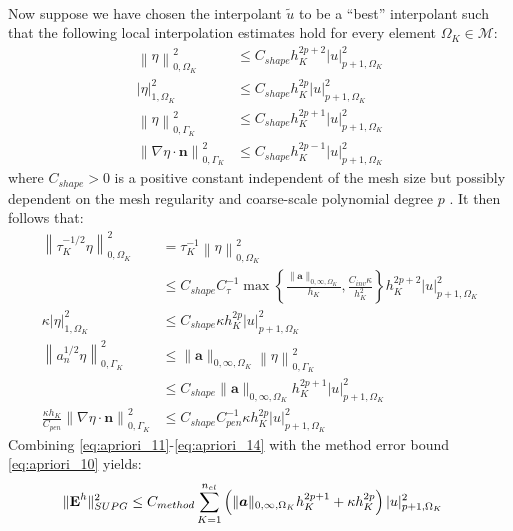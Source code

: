 \documentclass[11pt]{article}
\newenvironment{proof}[1][Proof]{\begin{trivlist}
\item[\hskip \labelsep {\bfseries #1}]}{\end{trivlist}}
\begin{document}
\begin{proof}
\begin{align}
\end{align}
Now suppose we have chosen the interpolant $\tilde{u}$ to be a ``best'' interpolant such that the following local interpolation estimates hold for every element $\Omega_K \in \mathcal{M}$:
\begin{align}
\left\| \eta \right\|^2_{0,\Omega_K} &\leq C_{shape} h_K^{2p+2} | u |^2_{p+1,\Omega_K} \nonumber \\
\left| \eta \right|^2_{1,\Omega_K} &\leq C_{shape} h_K^{2p} | u |^2_{p+1,\Omega_K} \nonumber \\
\left\| \eta \right\|^2_{0,\Gamma_K} &\leq C_{shape} h_K^{2p+1} | u |^2_{p+1,\Omega_K} \nonumber \\
\left\| \nabla \eta \cdot \bm{n} \right\|^2_{0,\Gamma_K} &\leq C_{shape} h_K^{2p-1} | u |^2_{p+1,\Omega_K} \nonumber
\end{align}
where $C_{shape} > 0$ is a positive constant independent of the mesh size but possibly dependent on the mesh regularity and coarse-scale polynomial degree $p$ \cite{Ciarlet02}.  It then follows that:
\begin{align}
\left\| \tau_K^{-1/2} \eta \right\|^2_{0,\Omega_K} &= \tau_K^{-1} \left\| \eta \right\|^2_{0,\Omega_K} \nonumber \\
&\leq C_{shape} C_{\tau}^{-1} \max\left\{ \frac{ \| \bm{a} \|_{0,\infty,\Omega_K}}{h_K}, \frac{C_{inv}\kappa}{h_K^2} \right\} h_K^{2p+2} | u |^2_{p+1,\Omega_K} \label{eq:apriori_11} \\
\kappa \left| \eta \right|^2_{1,\Omega_K} &\leq C_{shape} \kappa h_K^{2p} | u |^2_{p+1,\Omega_K} \label{eq:apriori_12} \\
\left\| a_n^{1/2} \eta \right\|^2_{0,\Gamma_K} &\leq \| \bm{a} \|_{0,\infty,\Omega_K} \left\| \eta \right\|^2_{0,\Gamma_K} \nonumber \\
&\leq C_{shape} \| \bm{a} \|_{0,\infty,\Omega_K} h_K^{2p+1} | u |^2_{p+1,\Omega_K} \label{eq:apriori_13} \\
\frac{\kappa h_K}{C_{pen}} \left\| \nabla \eta \cdot \bm{n} \right\|^2_{0,\Gamma_K} &\leq C_{shape} C_{pen}^{-1} \kappa h_K^{2p} | u |^2_{p+1,\Omega_K} \label{eq:apriori_14}
\end{align}
Combining \eqref{eq:apriori_11}-\eqref{eq:apriori_14} with the method error bound \eqref{eq:apriori_10} yields:
\begin{align}
\| \textup{\textbf{E}}^h \|^2_{SUPG} &\leq C_{method} \sum_{K=1}^{n_{el}} \left( \| \bm{a} \|_{0,\infty,\Omega_K} h^{2p+1}_K + \kappa h^{2p}_K \right) | u |^2_{p+1,\Omega_K} \label{eq:apriori_15}
\end{align}

\end{proof}
\end{document}
